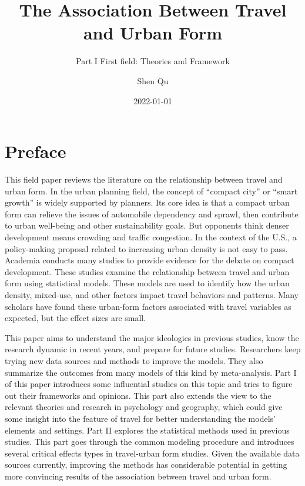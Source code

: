 \documentclass[
  12pt,
]{article}
\title{The Association Between Travel and Urban Form}
\subtitle{Part I First field: Theories and Framework}
\author{Shen Qu}
\date{2022-01-01}
\begin{document}
\maketitle

{
\setcounter{tocdepth}{2}
\tableofcontents
}
\hypertarget{preface}{%
\section*{Preface}\label{preface}}

This field paper reviews the literature on the relationship between travel and urban form. In the urban planning field, the concept of ``compact city'' or ``smart growth'' is widely supported by planners. Its core idea is that a compact urban form can relieve the issues of automobile dependency and sprawl, then contribute to urban well-being and other sustainability goals. But opponents think denser development means crowding and traffic congestion. In the context of the U.S., a policy-making proposal related to increasing urban density is not easy to pass. Academia conducts many studies to provide evidence for the debate on compact development. These studies examine the relationship between travel and urban form using statistical models. These models are used to identify how the urban density, mixed-use, and other factors impact travel behaviors and patterns. Many scholars have found these urban-form factors associated with travel variables as expected, but the effect sizes are small.

This paper aims to understand the major ideologies in previous studies, know the research dynamic in recent years, and prepare for future studies. Researchers keep trying new data sources and methods to improve the models. They also summarize the outcomes from many models of this kind by meta-analysis. Part I of this paper introduces some influential studies on this topic and tries to figure out their frameworks and opinions. This part also extends the view to the relevant theories and research in psychology and geography, which could give some insight into the feature of travel for better understanding the models' elements and settings. Part II explores the statistical methods used in previous studies. This part goes through the common modeling procedure and introduces several critical effects types in travel-urban form studies. Given the available data sources currently, improving the methods has considerable potential in getting more convincing results of the association between travel and urban form.
\end{document}
